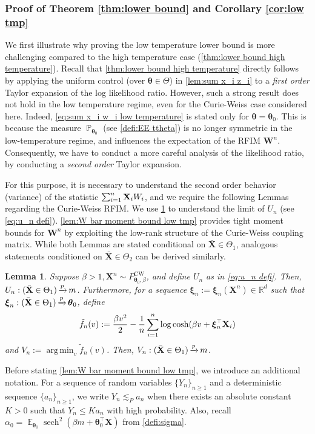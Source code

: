 \documentclass[preprint,reqno]{imsart}
\newtheorem{lemma}[thm]{Lemma}
\newcommand{\ttheta}{\boldsymbol{\theta}}
\DeclareMathOperator{\xp}{\xrightarrow{\mathnormal p}}
\DeclareMathOperator{\sech}{sech}
\DeclareMathOperator{\EE}{\mathbb{E}}
\DeclareMathOperator{\PP}{\mathbb{P}}
\newcommand{\W}{\mathbf{W}}
\newcommand{\X}{\mathbf{X}}
\newcommand{\xxi}{\boldsymbol \xi}
\DeclareMathOperator{\sumin}{\sum_{\mathnormal i=1}^{\mathnormal n}}
\DeclareMathOperator*{\argmin}{arg\,min}
\begin{document}
\begin{appendix}
%
%
%
%

\subsubsection{Proof of Theorem \ref{thm:lower bound} and Corollary \ref{cor:low tmp}}\label{subsec:proof of lower bound low}
{
We first illustrate why proving the low temperature lower bound is more challenging compared to the high temperature case (\cref{thm:lower bound high temperature}).
Recall that \cref{thm:lower bound high temperature} directly follows by applying the uniform control (over $\ttheta \in \Theta$) in \cref{lem:sum x_i z_i} to a \emph{first order} Taylor expansion of the log likelihood ratio. However, such a strong result does not hold in the low temperature regime, even for the Curie-Weiss case considered here. Indeed, \eqref{eq:sum x_i w_i low temperature} is stated only for $\ttheta = \ttheta_0$. This is because the measure $\PP_{\ttheta_0}$ (see \cref{defi:EE ttheta}) is no longer symmetric in the low-temperature regime, and influences the expectation of the RFIM $\W^n$. Consequently, we have to conduct a more careful analysis of the likelihood ratio, by conducting a \emph{second order} Taylor expansion.
}

For this purpose, it is necessary to understand the second order behavior (variance) of the statistic $\sumin \X_i W_i$, and we require the following Lemmas regarding the Curie-Weiss RFIM. We use \cref{lem: u n consistency} to understand the limit of $U_n$ (see \eqref{eq:u_n defi}). \cref{lem:W bar moment bound low tmp} provides tight moment bounds for $\W^n$ by exploiting the low-rank structure of the Curie-Weiss coupling matrix. While both Lemmas are stated conditional on $\bar{\X} \in \Theta_1$, analogous statements conditioned on $\bar{\X} \in \Theta_2$ can be derived similarly.

\begin{lemma}\label{lem: u n consistency}
Suppose $\beta > 1, \X^n \sim P_{\ttheta_0,\beta}^{\text{CW}}$, and define $U_n$ as in \eqref{eq:u_n defi}. Then, $U_n : (\bar{\X} \in \Theta_1) \xp m$. Furthermore, for a sequence $\xxi_n:= \xxi_n(\X^n) \in \mathbb{R}^d$ such that $\xxi_n : (\bar{\X} \in \Theta_1) \xp \ttheta_0$, define $$\tilde{f}_n(v) := \frac{\beta v^2}{2} - \frac{1}{n} \sumin \log \cosh(\beta v + \xxi_n^\top \X_i)$$ and $V_n:= \argmin_v \tilde{f}_n(v)$. Then, $V_n : (\bar{\X} \in \Theta_1) \xp m$.
%
%
%
%
%
%
%
\end{lemma}

Before stating \cref{lem:W bar moment bound low tmp}, we introduce an additional notation. For a sequence of random variables $\{Y_n\}_{n \ge 1}$ and a deterministic sequence $\{a_n\}_{n \ge 1}$, we write $Y_n \lesssim_P a_n$ when there exists an absolute constant $K>0$ such that $Y_n \le K a_n$ with high probability. Also, recall $\alpha_0 = \EE_{\ttheta_0} \sech^2(\beta m + \ttheta_0^\top \X)$ from \cref{defi:sigma}.


\end{appendix}
\end{document}
